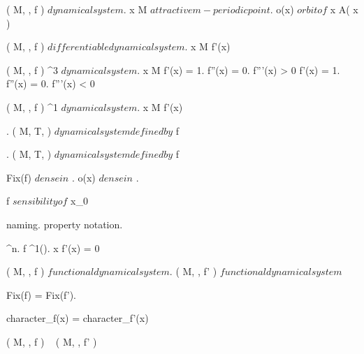 \documentclass[../Main/main]{subfiles}
\begin{document}
{	
	{
		{
			( M, \N, f ) $ dynamical system $.
			x \in M $ attractive m-periodic point $.
			o(x) $ orbit of $ x
		}
		{
		}
		\denote
		{
			A( x )
		}
	}
	
	
	{
		{
			( M, \N, f ) $ differentiable dynamical system $.
			x \in M
		}
		{
			f'(x) \in {}
		}
	}


	{
		{
			( M, \N, f ) \; \Cc^3 $ dynamical system $.
			x \in M
		}
		{
			f'(x) = 1.
			f''(x) = 0.
			f'''(x) > 0
		}
		{
			f'(x) = 1.
			f''(x) = 0.
			f'''(x) < 0
		}
	}
	
	
	{
		{
			( M, \N, f ) \Cc^1 $ dynamical system $.
			x \in M
		}
		{
			f'(x)
		}
	}
	
	
	{
		{
			.
			( M, T, \phi ) $ dynamical system defined by $ f
		}
		{
			{
			}
		}
	}
	
	
	{
		{
			.
			( M, T, \phi ) $ dynamical system defined by $ f
		}
		{
			Fix(f) $ dense in $ \R.
			{
				o(x) $ dense in $ \R
			}.

			f $ sensibility of $ x_0
		}
	}


	{
		{
			naming.
		}
		\denote
		{
			property \as notation.
		}
	}
	
	
	{
		{
			\Uc \subset \R^n.
			f \in \Cc^1(\Uc).
			x \in \Uc
		}
		{
			f'(x) = 0
		}
	}
	
	
	{
		{
			( M, \N, f ) $ functional dynamical system $.
			( M, \N, f' ) $ functional dynamical system $
		}
		{
			Fix(f) = Fix(f').

			{
				character_f(x) = character_{f'}(x)
			}
		}
		\denote
		{
			( M, \N, f ) ~ ( M, \N, f' )
		}
	}
	
}
\end{document}
